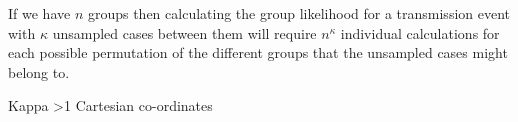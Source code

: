 \documentclass[11pt,a4paper]{report}
\begin{document}
If we have $n$ groups then calculating the group likelihood for a transmission event with $\kappa$ unsampled cases between them will require $n^\kappa$ individual calculations for each possible permutation of the different groups that the unsampled cases might belong to.



Kappa >1
Cartesian co-ordinates
\citet{outbrkr}


\end{document}
